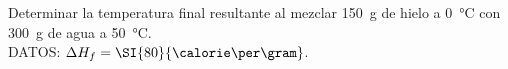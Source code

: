 Determinar la temperatura final resultante al mezclar \SI{150}{\gram} de hielo a \SI{0}{\celsius} con \SI{300}{\gram} de agua a \SI{50}{\celsius}.\\
    DATOS: $\Delta H_f = \SI{80}{\calorie\per\gram}$.
